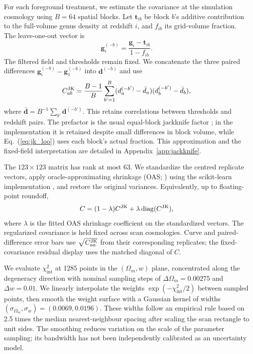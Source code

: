 For each foreground treatment, we estimate the covariance at the simulation cosmology using $B=64$ spatial blocks. Let $\boldsymbol t_{ib}$ be block $b$'s additive contribution to the full-volume genus density at redshift $i$, and $f_{ib}$ its grid-volume fraction. The leave-one-out vector is
\begin{equation}\label{eq:jk_loo}
\boldsymbol g_i^{(-b)}=\frac{\boldsymbol g_i-\boldsymbol t_{ib}}{1-f_{ib}}.
\end{equation}
The filtered field and thresholds remain fixed. We concatenate the three paired differences $\boldsymbol g_i^{(-b)}-\boldsymbol g_1^{(-b)}$ into $\boldsymbol d^{(-b)}$ and use
\begin{equation}\label{eq:jk_cov}
C^{\rm JK}_{ab}=\frac{B-1}{B}\sum_{b'=1}^{B}
(d_a^{(-b')}-\bar d_a)(d_b^{(-b')}-\bar d_b),
\end{equation}
where $\bar{\boldsymbol d}=B^{-1}\sum_{b'}\boldsymbol d^{(-b')}$. This retains correlations between thresholds and redshift pairs. The prefactor is the usual equal-block jackknife factor \citep{Norberg2009Errors}; in the implementation it is retained despite small differences in block volume, while Eq.~(\ref{eq:jk_loo}) uses each block's actual fraction. This approximation and the fixed-field interpretation are detailed in Appendix~\ref{app:jackknife}.

The $123\times123$ matrix has rank at most 63. We standardize the centred replicate vectors, apply oracle-approximating shrinkage (OAS; \citealt{Chen2010OAS}) using the scikit-learn implementation \citep{Pedregosa2011ScikitLearn}, and restore the original variances. Equivalently, up to floating-point roundoff,
\begin{equation}\label{eq:jk_oas}
C=(1-\lambda)C^{\rm JK}+\lambda\,\mathrm{diag}(C^{\rm JK}),
\end{equation}
where $\lambda$ is the fitted OAS shrinkage coefficient on the standardized vectors. The regularized covariance is held fixed across scan cosmologies. Curve and paired-difference error bars use $\sqrt{C^{\rm JK}_{aa}}$ from their corresponding replicates; the fixed-covariance residual display uses the matched diagonal of $C$.

We evaluate $\chi^2_{\mathrm{int}}$ at 1285 points in the $(\Omega_m,w)$ plane, concentrated along the degeneracy direction with nominal sampling steps of $\Delta\Omega_m=0.00275$ and $\Delta w=0.01$. We linearly interpolate the weights $\exp(-\chi^2_{\mathrm{int}}/2)$ between sampled points, then smooth the weight surface with a Gaussian kernel of widths $(\sigma_{\Omega_m},\sigma_w)=(0.0069,0.0196)$. These widths follow an empirical rule based on 2.5 times the median nearest-neighbour spacing after scaling the scan rectangle to unit sides. The smoothing reduces variation on the scale of the parameter sampling; its bandwidth has not been independently calibrated as an uncertainty model.

